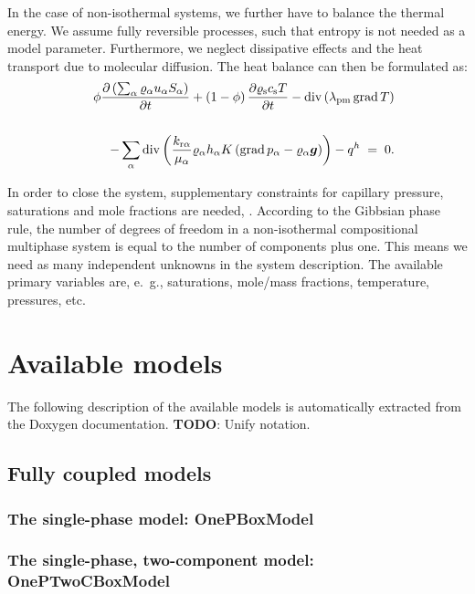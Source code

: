 In the case of non-isothermal systems, we further have to balance the
thermal energy. We assume fully reversible processes, such that entropy
is not needed as a model parameter. Furthermore, we neglect 
dissipative effects and the heat transport due to molecular
diffusion. The heat balance can then be
formulated as:
%
\begin{eqnarray}
  \label{A3:eqenergmak1}
  && \phi \frac{\partial \left( \sum_\alpha \varrho_{\alpha}
      u_\alpha S_\alpha \right)}{\partial t} + \left( 1 -
    \phi \right) \frac{\partial \varrho_{\text{s}} c_{\text{s}}
    T}{\partial t} \nonumber 
 - \operatorname{div} \left( \lambda_{\text{pm}} \operatorname{grad} T \right)
  \nonumber \\
  \nonumber \\
  && - \sum\limits_\alpha \operatorname{div} \left( \frac{k_{\text{r}
        \alpha}}{\mu_\alpha} \varrho_{\alpha} h_\alpha
    K \left( \operatorname{grad} p_\alpha - \varrho_{\alpha}
      \boldsymbol{g} \right) \right) \nonumber 
 - q^h \; = \; 0.
\end{eqnarray}

In order to close the system, supplementary constraints for capillary pressure, saturations and mole
fractions are needed, \cite{A3:helmig:1997}. 
According to the Gibbsian phase rule, the number of degrees of freedom
in a non-isothermal compositional multiphase system is equal to the
number of components plus one. This means we need as many independent
unknowns in the system description. The
available primary variables are, e.\ g., saturations, mole/mass
fractions, temperature, pressures, etc.




\section{Available models} 
The following description of the available models is automatically extracted 
from the Doxygen documentation. \textbf{TODO}: Unify notation. 

\subsection{Fully coupled models} 

\subsubsection{The single-phase model: OnePBoxModel} 


\subsubsection{The single-phase, two-component model:  OnePTwoCBoxModel} 


